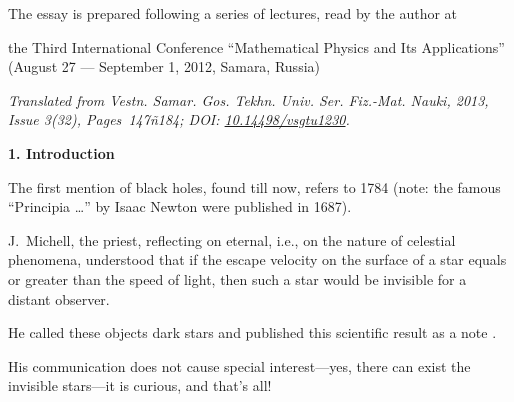 


\date{10/VIII/2013}






\makeengtitlef










{\small \noindent The essay is prepared following a series of lectures, read by the author at

the Third International Conference ``Mathematical Physics and Its Applications'' (August 27 --- September 1, 2012,  Samara, Russia)



\smallskip

\footnotesize \noindent \it Translated from Vestn. Samar. Gos. Tekhn. Univ. Ser. Fiz.-Mat. Nauki, 2013, Issue 3(32), Pages~147ñ184; DOI: \href{http://dx.doi.org/10.14498/vsgtu1230}{10.14498/vsgtu1230}.



}







\bigskip



\textbf{1. Introduction}



The first mention of black holes, found till now, refers to 1784 (note: the famous ``Principia \ldots'' by Isaac Newton were published in 1687). 

J.~Michell, the priest, reflecting on eternal, i.e., on the nature of celestial phenomena, understood that if the escape velocity on the surface of a star equals or greater than the speed of light, then such a star would be invisible for a distant observer. 

He called these objects dark stars and published this scientific result as a note \cite{berez:Mich}. 

His communication does not cause special interest---yes, there can exist the invisible stars---it is curious, and that's all! 

